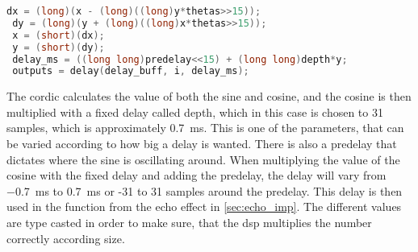 \begin{lstlisting}[caption={Implementation of the flanger effect on the DSP in C.},language=C,label={code:flanger_imp_code},tabsize=2]
 dx = (long)(x - (long)((long)y*thetas>>15));
 dy = (long)(y + (long)((long)x*thetas>>15));
 x = (short)(dx);
 y = (short)(dy);
 delay_ms = ((long long)predelay<<15) + (long long)depth*y;
 outputs = delay(delay_buff, i, delay_ms);
\end{lstlisting}


The \gls{cordic} calculates the value of both the sine and cosine, and the cosine is then multiplied with a fixed delay called depth, which in this case is chosen to 31 samples, which is approximately \SI{0.7}{\milli\second}. This is one of the parameters, that can be varied according to how big a delay is wanted. There is also a predelay that dictates where the sine is oscillating around. When multiplying the value of the cosine with the fixed delay and adding the predelay, the delay will vary from \SI{-0.7}{\milli\second} to \SI{0.7}{\milli\second} or -31 to 31 samples around the predelay. This delay is then used in the function from the echo effect in \autoref{sec:echo_imp}. The different values are type casted in order to make sure, that the \gls{dsp} multiplies the number correctly according size.

